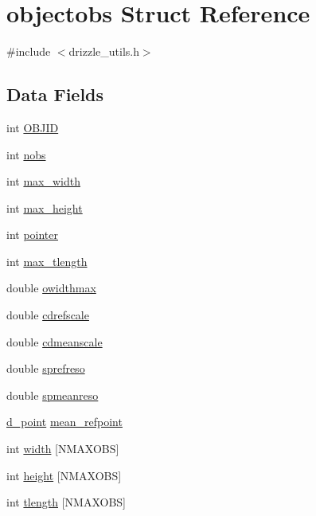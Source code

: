 \hypertarget{structobjectobs}{
\section{objectobs Struct Reference}
\label{structobjectobs}
}


{\ttfamily \#include $<$drizzle\_\-utils.h$>$}\subsection*{Data Fields}
\begin{DoxyCompactItemize}
\item 
int \hyperlink{structobjectobs_a88b94b6f2451266613f3bed2778dd160}{OBJID}
\item 
int \hyperlink{structobjectobs_ac587221ef0b2911eb7e07b93556430fd}{nobs}
\item 
int \hyperlink{structobjectobs_a14620b6d87f2c1f3d85de671bf6b6afc}{max\_\-width}
\item 
int \hyperlink{structobjectobs_ad37101c4854d55729abfdab899945ea4}{max\_\-height}
\item 
int \hyperlink{structobjectobs_a5be9a112da7729c2816a3e75e1cc6294}{pointer}
\item 
int \hyperlink{structobjectobs_a1db0b1143ec4290c46e9857e155e410c}{max\_\-tlength}
\item 
double \hyperlink{structobjectobs_a19e10e7b36a1727500721bd424510a7f}{owidthmax}
\item 
double \hyperlink{structobjectobs_a8eb527e1304fb90ac417cd12bdec67ae}{cdrefscale}
\item 
double \hyperlink{structobjectobs_a1506d3b4117e2c7681e896c75a83e7b4}{cdmeanscale}
\item 
double \hyperlink{structobjectobs_a4d0def177b0b4e6b6eb87c2ec4dc74ef}{sprefreso}
\item 
double \hyperlink{structobjectobs_ab76ccf40ceb7b963c8d811bce315fb66}{spmeanreso}
\item 
\hyperlink{structd__point}{d\_\-point} \hyperlink{structobjectobs_a564470d33d40d988a292f27562169026}{mean\_\-refpoint}
\item 
int \hyperlink{structobjectobs_afbfe52c98ae6a2b8011260da343bc335}{width} \mbox{[}NMAXOBS\mbox{]}
\item 
int \hyperlink{structobjectobs_ae0f18cbcb1718ff870d3ca7de30c40ba}{height} \mbox{[}NMAXOBS\mbox{]}
\item 
int \hyperlink{structobjectobs_a5918cb903ecff5ff7073fea76058fc45}{tlength} \mbox{[}NMAXOBS\mbox{]}

\end{DoxyCompactItemize}
